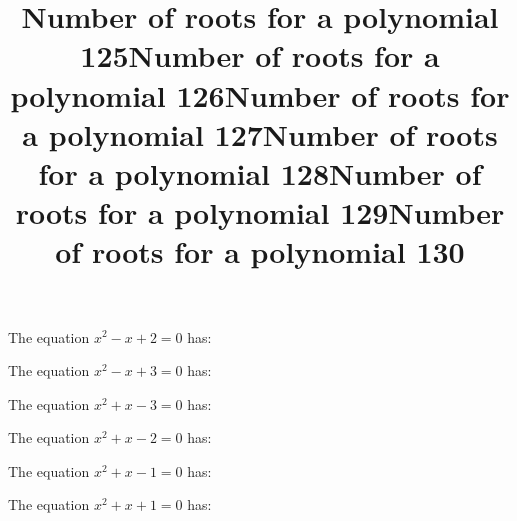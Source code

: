 \documentclass{article}
\begin{document}
\begin{category}
\begin{question}[multichoice]


\end{question}
\begin{question}[multichoice]
\title{Number of roots for a polynomial 125}
The equation $x^{2} - x + 2=0$ has:



\end{question}
\begin{question}[multichoice]
\title{Number of roots for a polynomial 126}
The equation $x^{2} - x + 3=0$ has:



\end{question}
\begin{question}[multichoice]
\title{Number of roots for a polynomial 127}
The equation $x^{2} + x - 3=0$ has:



\end{question}
\begin{question}[multichoice]
\title{Number of roots for a polynomial 128}
The equation $x^{2} + x - 2=0$ has:



\end{question}
\begin{question}[multichoice]
\title{Number of roots for a polynomial 129}
The equation $x^{2} + x - 1=0$ has:



\end{question}
\begin{question}[multichoice]
\title{Number of roots for a polynomial 130}
The equation $x^{2} + x + 1=0$ has:




\end{question}
\end{category}
\end{document}
